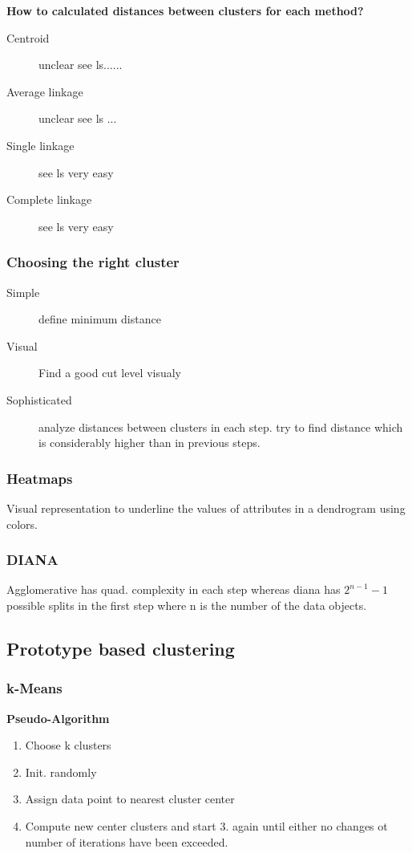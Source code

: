 \documentclass[fleqn, oneside, 10pt, titlepage]{article}
\begin{document}
\textbf{How to calculated distances between clusters for each method?}
\begin{description}
	\item[Centroid] unclear see ls......
	\item[Average linkage] unclear see ls ...
	\item[Single linkage] see ls very easy
	\item[Complete linkage] see ls very easy
\end{description}

\subsubsection{Choosing the right cluster}
\begin{description}
	\item[Simple] define minimum distance
	\item[Visual] Find a good cut level visualy
	\item[Sophisticated] analyze distances between clusters in each step. try to find distance which is considerably higher than in previous steps.
\end{description}

\subsubsection{Heatmaps}

Visual representation to underline the values of attributes in a dendrogram using colors.

\subsubsection{DIANA}
Agglomerative has quad. complexity in each step whereas diana has $2^{n-1}-1$ possible splits in the first step where n is the number of the data objects.

\subsection{Prototype based clustering}
\subsubsection{k-Means}
\textbf{Pseudo-Algorithm}
\begin{enumerate}
	\item Choose k clusters
	\item Init. randomly
	\item Assign data point to nearest cluster center
	\item Compute new center clusters and start 3. again until either no changes ot number of iterations have been exceeded.
\end{enumerate}
\end{document}

